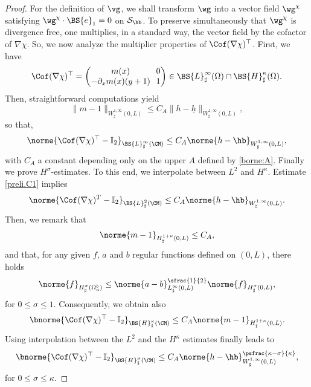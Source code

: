 \begin{proof}
For the definition of $\vg$, we shall transform $\wg$ into a vector field $\wg^{\chi}$ satisfying $\wg^{\chi} \cdot \BS{e}_1 = 0$ on $\mathcal S_{\hb}$. To preserve simultaneously that $\wg^{\chi}$ is divergence free, one multiplies, in a standard way, the vector field by the cofactor of $\nabla \chi$. So, we now analyze the multiplier properties of $\Cof(\nabla\chi)^{\top}$. First, we have
\[\arraycolsep3.5pt
\Cof(\nabla\chi)^{\top} = \begin{pmatrix}
m(x)&0\\
-\partial_x m(x)(y+1)&1\\
\end{pmatrix} \in \BS{L}^\infty_\sharp(\Omega)\cap \BS{H}_\sharp^\kappa(\Omega).
\]
Then, straightforward computations yield
\begin{equation} \label{prelim.h}
\|m-1\|_{W^{1,\infty}_{\sharp}(0,L)} \leq C_A \|h-\underline{h}\|_{W^{1,\infty}_{\sharp}(0,L)},
\end{equation}
so that,
\begin{equation}\label{preli.C1}
\norme{\Cof(\nabla\chi)^{\top}-\mathbb I_2}_{\BS{L}^{\infty}_{\sharp}(\CM)}\leq C_A\norme{h-\hb}_{W^{1,\infty}_{\sharp}(0,L)},
\end{equation}
with $C_A$ a constant depending only on the upper $A$ defined by \eqref{borne:A}.
Finally we prove $H^{\sigma}$-estimates.
To this end, we interpolate between $L^2$ and $H^\kappa$. Estimate \eqref{preli.C1} implies
\[
\norme{\Cof(\nabla\chi)^{T}-\mathbb I_2}_{\BS{L}^{2}_{\sharp}(\CM)}\leq C_A\norme{h-\hb}_{W^{1,\infty}_{\sharp}(0,L)}.
\]
Then, we remark that
\[
\norme{m-1}_{H^{1+\kappa}_{\sharp}(0,L)}\leq C_{A},
\]
and that, for any given $f$, $a$ and $b$ regular functions defined on $(0,L)$, there holds
\begin{equation}\label{2D.1D.estimate}\norme{f}_{H_\sharp^{\sigma}(\Omega_{a}^{b})}\leq \norme{a-b}_{L_\sharp^{\infty}(0,L)}^{\sfrac{1}{2}}\norme{f}_{H_\sharp^{\sigma}(0,L)},
\end{equation}
for $0\leq \sigma\leq 1$. Consequently, we obtain also
\[\bnorme{\Cof(\nabla\chi)^{\top}-\mathbb I_2}_{\BS{H}^{\kappa}_{\sharp}(\CM)}\leq C_A\norme{m-1}_{H^{1+\kappa}_{\sharp}(0,L)}.
\]
Using interpolation between the $L^{2}$ and the $H^{\kappa}$ estimates finally leads to
\begin{equation}\label{preli.Hs}\bnorme{\Cof(\nabla\chi)^{\top}-\mathbb I_2}_{\BS{H}^{\sigma}_{\sharp}(\CM)}\leq C_A \norme{h-\hb}_{W^{1,\infty}_{\sharp}(0,L)}^{\psfrac{\kappa-\sigma}{\kappa}},
\end{equation}
for $0\leq \sigma\leq \kappa$.


\end{proof}

